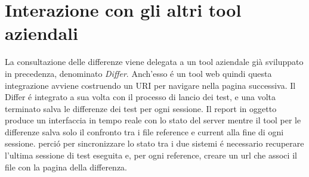             \section{Interazione con gli altri tool aziendali}
                La consultazione delle differenze viene delegata a un tool aziendale già sviluppato in precedenza, denominato \textit{Differ}.
                Anch'esso \'e un tool web quindi questa integrazione avviene  costruendo un URI per navigare nella pagina successiva.
                Il Differ \'e integrato a sua volta con il processo di lancio dei test, e una volta terminato salva le differenze dei test per ogni sessione.
                Il report in oggetto produce un interfaccia in tempo reale con lo stato del server mentre il tool per le differenze salva solo il confronto tra i file reference e current alla fine di ogni sessione.
                perci\'o per sincronizzare lo stato tra i due sistemi \'e necessario recuperare l'ultima sessione di test eseguita e, per ogni reference, creare un url che associ il file con la pagina della differenza.